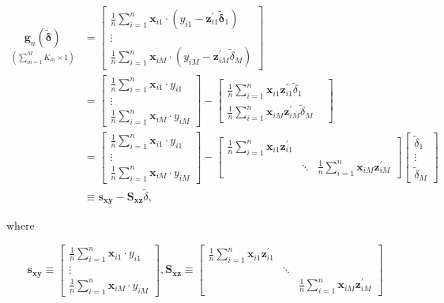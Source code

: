 \documentclass[10pt]{article}
\begin{document}
\begin{align*}
\underset{\left(\sum_{m=1}^{M} K_{m} \times 1\right)}{\mathbf{g}_{n}(\tilde{\boldsymbol{\delta}})} & =\left[\begin{array}{c}
\frac{1}{n} \sum_{i=1}^{n} \mathbf{x}_{i 1} \cdot\left(y_{i 1}-\mathbf{z}_{i 1}^{\prime} \tilde{\boldsymbol{\delta}}_{1}\right) \\
\vdots \\
\frac{1}{n} \sum_{i=1}^{n} \mathbf{x}_{i M} \cdot\left(y_{i M}-\mathbf{z}_{i M}^{\prime} \tilde{\delta}_{M}\right)
\end{array}\right] \\
& =\left[\begin{array}{c}
\frac{1}{n} \sum_{i=1}^{n} \mathbf{x}_{i 1} \cdot y_{i 1} \\
\vdots \\
\frac{1}{n} \sum_{i=1}^{n} \mathbf{x}_{i M} \cdot y_{i M}
\end{array}\right]-\left[\begin{array}{ccc}
\frac{1}{n} \sum_{i=1}^{n} \mathbf{x}_{i 1} \mathbf{z}_{i 1}^{\prime} \tilde{\delta}_{1} & \\
\frac{1}{n} \sum_{i=1}^{n} \mathbf{x}_{i M} \mathbf{z}_{i M}^{\prime} \tilde{\delta}_{M}
\end{array}\right] \\
& =\left[\begin{array}{c}
\frac{1}{n} \sum_{i=1}^{n} \mathbf{x}_{i 1} \cdot y_{i 1} \\
\vdots \\
\frac{1}{n} \sum_{i=1}^{n} \mathbf{x}_{i M} \cdot y_{i M}
\end{array}\right]-\left[\begin{array}{ccc}
\frac{1}{n} \sum_{i=1}^{n} \mathbf{x}_{i 1} \mathbf{z}_{i 1}^{\prime} & & \\
& \ddots & \frac{1}{n} \sum_{i=1}^{n} \mathbf{x}_{i M} \mathbf{z}_{i M}^{\prime}
\end{array}\right]\left[\begin{array}{c}
\tilde{\delta}_{1} \\
\vdots \\
\tilde{\delta}_{M}
\end{array}\right] \\
& \equiv \mathbf{s}_{\mathbf{x y}}-\mathbf{S}_{\mathbf{x z}} \tilde{\delta}, \tag{4.2.1}
\end{align*}


where

\[
\mathbf{s}_{\mathbf{x y}} \equiv\left[\begin{array}{c}
\frac{1}{n} \sum_{i=1}^{n} \mathbf{x}_{i 1} \cdot y_{i 1}  \tag{4.2.2}\\
\vdots \\
\frac{1}{n} \sum_{i=1}^{n} \mathbf{x}_{i M} \cdot y_{i M}
\end{array}\right], \mathbf{S}_{\mathbf{x z}} \equiv\left[\begin{array}{ccc}
\frac{1}{n} \sum_{i=1}^{n} \mathbf{x}_{i 1} \mathbf{z}_{i 1}^{\prime} & & \\
& \ddots & \\
& & \frac{1}{n} \sum_{i=1}^{n} \mathbf{x}_{i M} \mathbf{z}_{i M}^{\prime}
\end{array}\right]
\]
\end{document}
